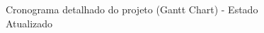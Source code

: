 \begin{landscape}
    \begin{figure}[p]
        \centering
        \caption{Cronograma detalhado do projeto (Gantt Chart) - Estado Atualizado}
        \label{fig:gantt-chart}
    \end{figure}
\end{landscape}

